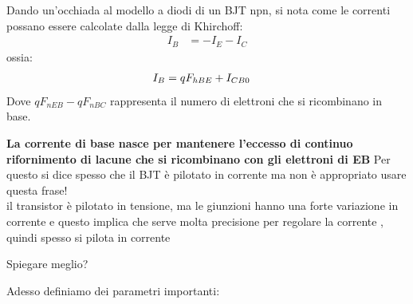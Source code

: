Dando un'occhiada al modello a diodi di un BJT npn, si nota come le correnti possano essere calcolate dalla legge di Khirchoff:
\begin{align}
    I_B &= -I_E-I_C
\end{align}
ossia:
\begin{align}
     I_B &= qF_{hBE}+\-I_{CB0}
\end{align}
Dove $qF_{nEB}-qF_{nBC}$ rappresenta il numero di elettroni che si ricombinano in base.
\begin{psbox}
\textbf{La corrente di base nasce per mantenere l'eccesso di continuo rifornimento di lacune che si ricombinano con gli elettroni di EB}
    Per questo si dice spesso che il BJT è pilotato in corrente  ma non è appropriato usare questa frase!\\
    il transistor è pilotato in tensione, ma le giunzioni hanno una forte variazione in corrente e questo implica che serve molta precisione per regolare la corrente , quindi spesso si pilota in corrente
    \begin{ricevimento}
        Spiegare meglio?
    \end{ricevimento}
\end{psbox}
Adesso definiamo dei parametri importanti:
